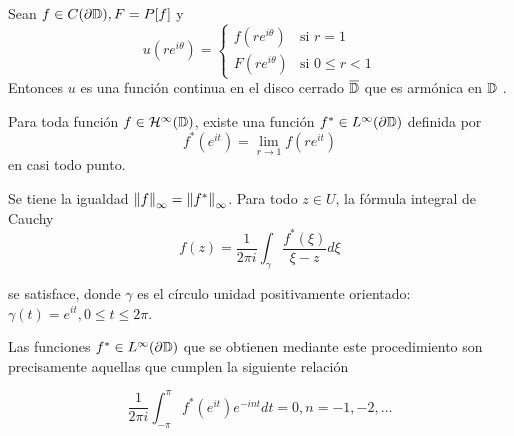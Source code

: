 \begin{theorem}
    \label{fatouaux2}
    Sean $f \in C (\partial \mathbb{D}), F=P[f]$ y
    \begin{equation*}
        u(re^{i \theta}) =
        \begin{cases}
            f(re^{i\theta}) & \text{si } r=1\\ F(re^{i\theta}) & \text{si } 0 \leq r<1
        \end{cases}
    \end{equation*}
    Entonces $u$ es una función continua en el disco cerrado $\overline{\mathbb{D}}$ que es armónica en $\mathbb{D}$ .
\end{theorem}

\begin{theorem}
    Para toda función $f \in \mathcal{H}^{\infty}(\mathbb{D})$, existe una función $f^* \in L^{\infty} (\partial \mathbb{D})$ definida por
    \begin{equation}
        \label{fatou1}
        f^*(e^{it}) = \lim_{r \rightarrow 1} f(re^{it})
    \end{equation}
    en casi todo punto.

    Se tiene la igualdad $\left\lVert f\right\rVert_{\infty} = \left\lVert f^*\right\rVert_{\infty}$. Para todo $z \in U$, la fórmula integral de Cauchy
    \begin{equation}
        \label{fatou2}
        f(z) = \dfrac{1}{2 \pi i} \int_{\gamma} \dfrac{f^*(\xi)}{\xi - z} d\xi
    \end{equation}

    se satisface, donde $\gamma$ es el círculo unidad positivamente orientado: $\gamma(t) = e^{it}, 0 \leq t \leq 2 \pi$.

    Las funciones $f^* \in L^{\infty}(\partial \mathbb{D})$ que se obtienen mediante este procedimiento son precisamente aquellas que cumplen la siguiente relación

    \begin{equation}
        \label{fatou3}
        \dfrac{1}{2 \pi i} \int_{-\pi}^{\pi} f^*(e^{it})e^{-int} dt = 0, n = -1,-2, \dots
    \end{equation}
\end{theorem}

